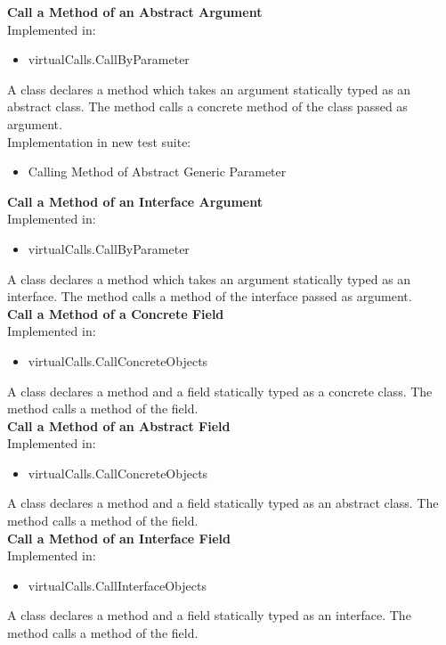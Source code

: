 \documentclass{article}
\begin{document}
\noindent
\textbf{Call a Method of an Abstract Argument}\\
Implemented in: 
\begin{itemize}
    \item virtualCalls.CallByParameter
\end{itemize}
A class declares a method which takes an argument statically typed as an abstract class. The method calls a concrete method of the class passed as argument.\\
Implementation in new test suite: 
\begin{itemize}
    \item Calling Method of Abstract Generic Parameter
\end{itemize}

\noindent
\textbf{Call a Method of an Interface Argument}\\
Implemented in: 
\begin{itemize}
    \item virtualCalls.CallByParameter
\end{itemize}
A class declares a method which takes an argument statically typed as an interface. The method calls a method of the interface passed as argument.\\

\noindent
\textbf{Call a Method of a Concrete Field}\\
Implemented in: 
\begin{itemize}
    \item virtualCalls.CallConcreteObjects
\end{itemize}
A class declares a method and a field statically typed as a concrete class. The method calls a method of the field.\\

\noindent
\textbf{Call a Method of an Abstract Field}\\
Implemented in: 
\begin{itemize}
    \item virtualCalls.CallConcreteObjects
\end{itemize}
A class declares a method and a field statically typed as an abstract class. The method calls a method of the field.\\

\noindent
\textbf{Call a Method of an Interface Field}\\
Implemented in: 
\begin{itemize}
    \item virtualCalls.CallInterfaceObjects
\end{itemize}
A class declares a method and a field statically typed as an interface. The method calls a method of the field.\\
\end{document}
